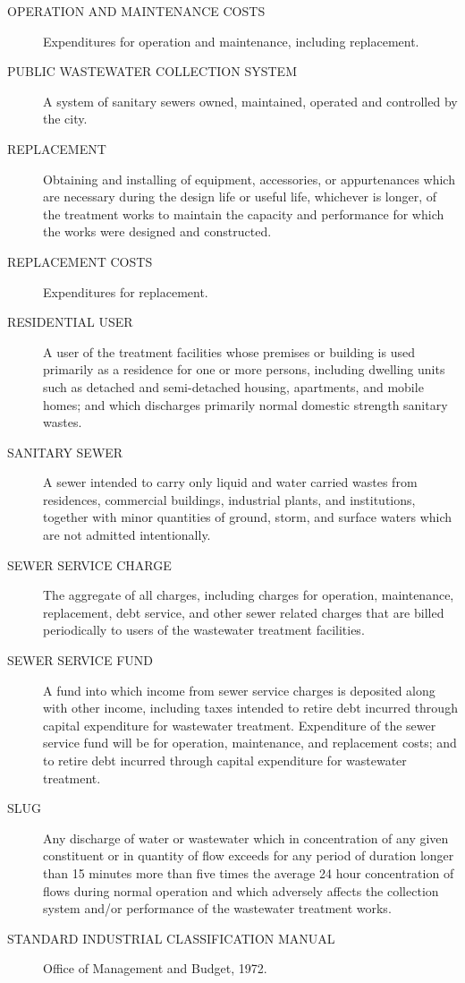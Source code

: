 \documentclass[code.tex]{subfiles}
\begin{document}
\begin{description}
\item[OPERATION AND MAINTENANCE COSTS] Expenditures for operation and maintenance, including replacement.
\item[PUBLIC WASTEWATER COLLECTION SYSTEM] A system of sanitary sewers owned, maintained, operated and controlled by the city.
\item[REPLACEMENT] Obtaining and installing of equipment, accessories, or appurtenances which are necessary during the design life or useful life, whichever is longer, of the treatment works to maintain the capacity and performance for which the works were designed and constructed.
\item[REPLACEMENT COSTS] Expenditures for replacement.
\item[RESIDENTIAL USER] A user of the treatment facilities whose premises or building is used primarily as a residence for one or more persons, including dwelling units such as detached and semi-detached housing, apartments, and mobile homes; and which discharges primarily normal domestic strength sanitary wastes.
\item[SANITARY SEWER] A sewer intended to carry only liquid and water carried wastes from residences, commercial buildings, industrial plants, and institutions, together with minor quantities of ground, storm, and surface waters which are not admitted intentionally.
\item[SEWER SERVICE CHARGE] The aggregate of all charges, including charges for operation, maintenance, replacement, debt service, and other sewer related charges that are billed periodically to users of the wastewater treatment facilities.
\item[SEWER SERVICE FUND] A fund into which income from sewer service charges is deposited along with other income, including taxes intended to retire debt incurred through capital expenditure for wastewater treatment.  Expenditure of the sewer service fund will be for operation, maintenance, and replacement costs; and to retire debt incurred through capital expenditure for wastewater treatment.
\item[SLUG] Any discharge of water or wastewater which in concentration of any given constituent or in quantity of flow exceeds for any period of duration longer than 15 minutes more than five times the average 24 hour concentration of flows during normal operation and which adversely affects the collection system and/or performance of the wastewater treatment works.
\item[STANDARD INDUSTRIAL CLASSIFICATION MANUAL] Office of Management and Budget, 1972.

\end{description}
\end{document}
